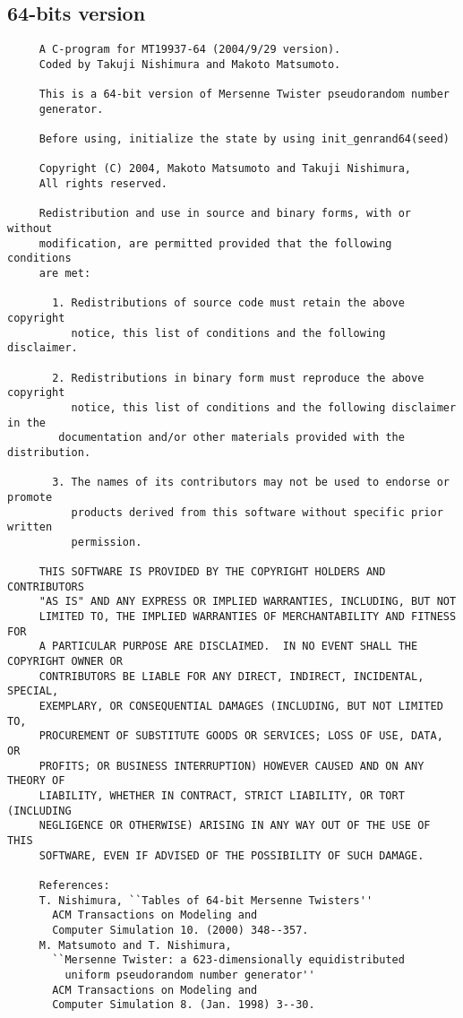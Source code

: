 \subsection*{64-bits version}
\begin{verbatim}
     A C-program for MT19937-64 (2004/9/29 version).
     Coded by Takuji Nishimura and Makoto Matsumoto.

     This is a 64-bit version of Mersenne Twister pseudorandom number
     generator.

     Before using, initialize the state by using init_genrand64(seed)  

     Copyright (C) 2004, Makoto Matsumoto and Takuji Nishimura,
     All rights reserved.                          

     Redistribution and use in source and binary forms, with or without
     modification, are permitted provided that the following conditions
     are met:

       1. Redistributions of source code must retain the above copyright
          notice, this list of conditions and the following disclaimer.

       2. Redistributions in binary form must reproduce the above copyright
          notice, this list of conditions and the following disclaimer in the
        documentation and/or other materials provided with the distribution.

       3. The names of its contributors may not be used to endorse or promote 
          products derived from this software without specific prior written 
          permission.

     THIS SOFTWARE IS PROVIDED BY THE COPYRIGHT HOLDERS AND CONTRIBUTORS
     "AS IS" AND ANY EXPRESS OR IMPLIED WARRANTIES, INCLUDING, BUT NOT
     LIMITED TO, THE IMPLIED WARRANTIES OF MERCHANTABILITY AND FITNESS FOR
     A PARTICULAR PURPOSE ARE DISCLAIMED.  IN NO EVENT SHALL THE COPYRIGHT OWNER OR
     CONTRIBUTORS BE LIABLE FOR ANY DIRECT, INDIRECT, INCIDENTAL, SPECIAL,
     EXEMPLARY, OR CONSEQUENTIAL DAMAGES (INCLUDING, BUT NOT LIMITED TO,
     PROCUREMENT OF SUBSTITUTE GOODS OR SERVICES; LOSS OF USE, DATA, OR
     PROFITS; OR BUSINESS INTERRUPTION) HOWEVER CAUSED AND ON ANY THEORY OF
     LIABILITY, WHETHER IN CONTRACT, STRICT LIABILITY, OR TORT (INCLUDING
     NEGLIGENCE OR OTHERWISE) ARISING IN ANY WAY OUT OF THE USE OF THIS
     SOFTWARE, EVEN IF ADVISED OF THE POSSIBILITY OF SUCH DAMAGE.

     References:
     T. Nishimura, ``Tables of 64-bit Mersenne Twisters''
       ACM Transactions on Modeling and 
       Computer Simulation 10. (2000) 348--357.
     M. Matsumoto and T. Nishimura,
       ``Mersenne Twister: a 623-dimensionally equidistributed
         uniform pseudorandom number generator''
       ACM Transactions on Modeling and 
       Computer Simulation 8. (Jan. 1998) 3--30.
\end{verbatim}

